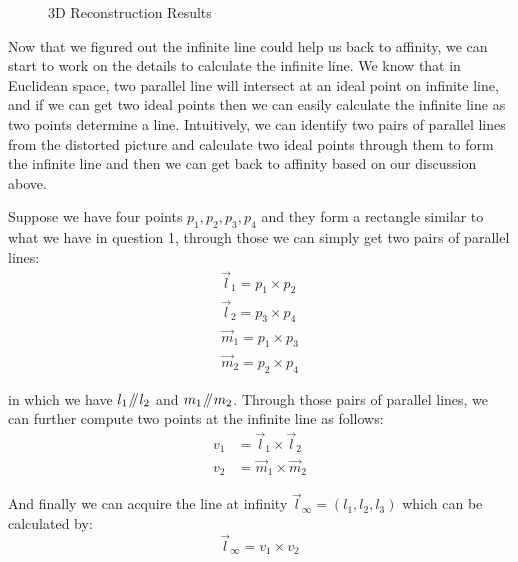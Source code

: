 \documentclass[conference]{IEEEtran}
\let\oldvec\vec
\renewcommand{\vec}[1]{\oldvec{\mathit{#1}}}
\newcommand{\parallelsum}{\mathbin{\!/\mkern-5mu/\!}}
\begin{document}
\begin{figure*}[hbpt]
\caption{3D Reconstruction Results}
\label{recon} %
\end{figure*}

Now that we figured out the infinite line could help us back to affinity, we can start to work on the details to calculate the infinite line. We know that in Euclidean space, two parallel line will intersect at an ideal point on infinite line, and if we can get two ideal points then we can easily calculate the infinite line as two points determine a line. Intuitively, we can identify two pairs of parallel lines from the distorted picture and calculate two ideal points through them to form the infinite line and then we can get back to affinity based on our discussion above.

Suppose we have four points $p_1, p_2, p_3, p_4$ and they form a rectangle similar to what we have in question 1, through those we can simply get two pairs of parallel lines:
\begin{equation}
\begin{split}
	\vec{l}_1 = p_1 \times p_2\\
	\vec{l}_2 = p_3 \times p_4\\
	\vec{m}_1 = p_1 \times p_3\\
	\vec{m}_2 = p_2 \times p_4
\end{split}
\end{equation}

\noindent in which we have $l_1\parallelsum l_2$ and $m_1\parallelsum m_2$. Through those pairs of parallel lines, we can further compute two points at the infinite line as follows:
\begin{equation}
\begin{split}
	v_1 &= \vec{l}_1\times \vec{l}_2\\
	v_2 &= \vec{m}_1 \times \vec{m}_2
\end{split}
\end{equation}

\noindent And finally we can acquire the line at infinity $\vec{l}_{\infty} = (l_1, l_2, l_3)$ which can be calculated by:
\begin{equation}
	\vec{l}_{\infty} = v_1 \times v_2
\end{equation}
\end{document}
